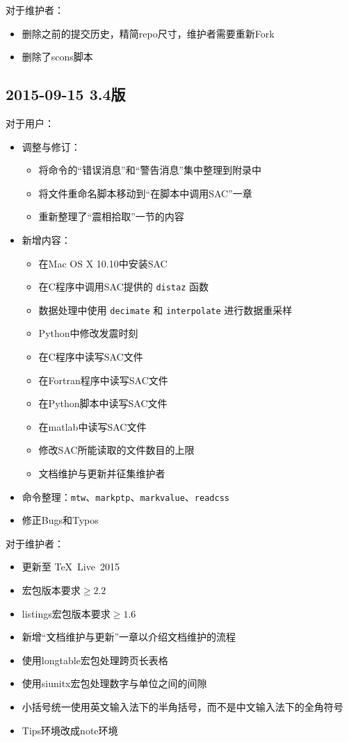 对于维护者：
\begin{itemize}
\item 删除之前的提交历史，精简repo尺寸，维护者需要重新Fork
\item 删除了scons脚本
\end{itemize}

\subsection*{2015-09-15 3.4版}
对于用户：
\begin{itemize}
\item 调整与修订：
    \begin{itemize}
    \item 将命令的``错误消息''和``警告消息''集中整理到附录中
    \item 将文件重命名脚本移动到``在脚本中调用SAC''一章
    \item 重新整理了``震相拾取''一节的内容
    \end{itemize}
\item 新增内容：
    \begin{itemize}
    \item 在Mac OS X 10.10中安装SAC
    \item 在C程序中调用SAC提供的 \texttt{distaz} 函数
    \item 数据处理中使用 \texttt{decimate} 和 \texttt{interpolate} 进行数据重采样
    \item Python中修改发震时刻
    \item 在C程序中读写SAC文件
    \item 在Fortran程序中读写SAC文件
    \item 在Python脚本中读写SAC文件
    \item 在matlab中读写SAC文件
    \item 修改SAC所能读取的文件数目的上限
    \item 文档维护与更新并征集维护者
    \end{itemize}
\item 命令整理：\texttt{mtw}、\texttt{markptp}、\texttt{markvalue}、\texttt{readcss}
\item 修正Bugs和Typos
\end{itemize}

对于维护者：
\begin{itemize}
\item 更新至 \TeX~Live~2015
\item \CTeX 宏包版本要求$\geq 2.2$
\item listings宏包版本要求$\geq 1.6$
\item 新增``文档维护与更新''一章以介绍文档维护的流程
\item 使用longtable宏包处理跨页长表格
\item 使用siunitx宏包处理数字与单位之间的间隙
\item 小括号统一使用英文输入法下的半角括号，而不是中文输入法下的全角符号
\item Tips环境改成note环境
\end{itemize}

